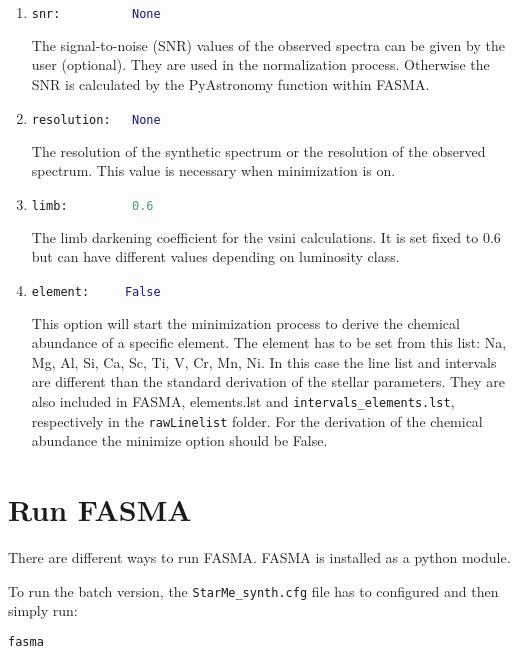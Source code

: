 \documentclass[a4paper,12pt]{article}
\begin{document}
\begin{enumerate}
\item
\begin{lstlisting}[language=Python]
snr:          None
\end{lstlisting}
The signal-to-noise (SNR) values of the observed spectra can be given by the user (optional). They are used in the normalization process. Otherwise the SNR is calculated by the PyAstronomy function 
within FASMA.

\item
\begin{lstlisting}[language=Python]
resolution:   None
\end{lstlisting}
The resolution of the synthetic spectrum or the resolution of the observed spectrum. This value is necessary when minimization is on.

\item
\begin{lstlisting}[language=Python]
limb:         0.6
\end{lstlisting}
The limb darkening coefficient for the vsini calculations. It is set fixed to 0.6 but can have different values depending on luminosity class.

\item
\begin{lstlisting}[language=Python]
element:     False
\end{lstlisting}
This option will start the minimization process to derive the chemical abundance of a specific element. The element has to be set from this list: 
Na, Mg, Al, Si, Ca, Sc, Ti, V, Cr, Mn, Ni. In this case the line list and intervals are different than the standard derivation of the stellar parameters. 
They are also included in FASMA, elements.lst and \texttt{intervals\_elements.lst}, respectively in the \texttt{rawLinelist} folder. For the derivation of the chemical 
abundance the minimize option should be False. 

\end{enumerate}


\section{Run FASMA}

There are different ways to run FASMA. FASMA is installed as a python module. 

To run the batch version, the \texttt{StarMe\_synth.cfg} file has to configured and then simply run:
\begin{lstlisting}[language=Python]
fasma
\end{lstlisting}
\end{document}
